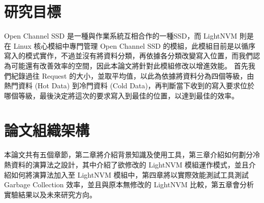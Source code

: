 
\section{研究目標}
\indent
Open Channel SSD 是一種與作業系統互相合作的一種SSD\cite{OCSSD_Good}，而 LightNVM 則是在 Linux 核心模組中專門管理 Open Channel SSD 的模組\cite{LightNVM}，此模組目前是以循序寫入的模式實作，不過並沒有將資料分類，再依據各分類改變寫入位置，而我們認為可能還有改善效率的空間，因此本論文將針對此模組修改以增進效能。
\indent
首先我們紀錄過往 Request 的大小，並取平均值，以此為依據將資料分為四個等級，由熱門資料 (Hot Data) 到冷門資料 (Cold Data)，再判斷當下收到的寫入要求位於哪個等級，最後決定將這次的要求寫入到最佳的位置，以達到最佳的效率。


\section{論文組織架構}
\indent
本論文共有五個章節，第二章將介紹背景知識及使用工具，第三章介紹如何劃分冷熱資料的演算法之設計，其中介紹了欲修改的 LightNVM 模組運作模式，並且介紹如何將演算法加入至 LightNVM 模組中，第四章將以實際效能測試工具測試 Garbage Collection 效率，並且與原本無修改的 LightNVM 比較，第五章會分析實驗結果以及未來研究方向。

